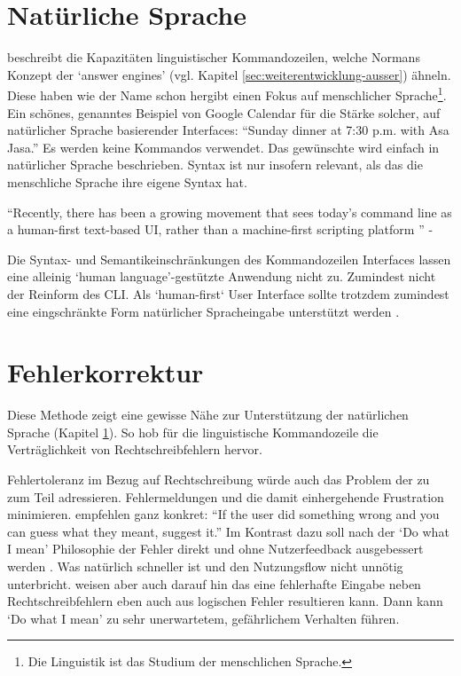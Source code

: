 \documentclass[oneside,bibliography=totocnumbered,BCOR=5mm]{scrbook}
\begin{document}
\section{Natürliche Sprache}
\label{sec:natural-lang}

\textcite{Raskin_2008} beschreibt die Kapazitäten linguistischer
Kommandozeilen, welche Normans Konzept der `answer engines' (vgl. Kapitel
\ref{sec:weiterentwicklung-ausser}) ähneln. Diese haben wie der Name schon
hergibt einen Fokus auf menschlicher Sprache\footnote{Die Linguistik ist das
Studium der menschlichen Sprache.}. Ein schönes, genanntes Beispiel von Google
Calendar für die Stärke solcher, auf natürlicher Sprache basierender Interfaces:
``Sunday dinner at 7:30 p.m. with Asa Jasa.'' Es werden keine Kommandos
verwendet. Das gewünschte wird einfach in natürlicher Sprache beschrieben.
Syntax ist nur insofern relevant, als das die menschliche Sprache ihre eigene
Syntax hat.

\medskip

``Recently, there has been a growing movement that sees today's command line
as a human-first text-based UI, rather than a machine-first scripting platform
\parencite{clig}'' - \parencite{Schr_der_2021}

\medskip

Die Syntax- und Semantikeinschränkungen des Kommandozeilen Interfaces lassen
eine alleinig `human language'-gestützte Anwendung nicht zu. Zumindest nicht
der Reinform des CLI. Als `human-first` User Interface sollte trotzdem
zumindest eine eingschränkte Form natürlicher Spracheingabe unterstützt werden
\parencite{seneviratne2008new}.


\section{Fehlerkorrektur}

Diese Methode zeigt eine gewisse Nähe zur Unterstützung der natürlichen
Sprache (Kapitel \ref{sec:natural-lang}). So hob \textcite{Raskin_2008} für die
linguistische Kommandozeile die Verträglichkeit von Rechtschreibfehlern hervor.

\smallskip

Fehlertoleranz im Bezug auf Rechtschreibung würde auch das Problem der zu
 zum Teil adressieren. Fehlermeldungen und die damit
einhergehende Frustration minimieren. \textcite{clig} empfehlen ganz konkret: ``If
the user did something wrong and you can guess what they meant, suggest it.''
Im Kontrast dazu soll nach der `Do what I mean' Philosophie der Fehler direkt
und ohne Nutzerfeedback ausgebessert werden \parencite{DWIM}. Was natürlich
schneller ist und den Nutzungsflow nicht unnötig unterbricht. \textcite{clig} weisen
aber auch darauf hin das eine fehlerhafte Eingabe neben Rechtschreibfehlern eben
auch aus logischen Fehler resultieren kann. Dann kann `Do what I mean' zu sehr
unerwartetem, gefährlichem Verhalten führen.
\end{document}
